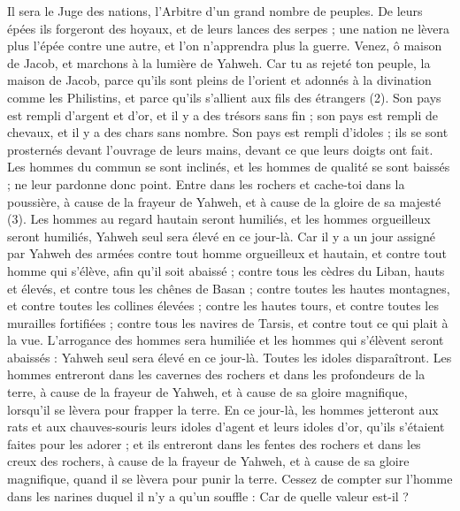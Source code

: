 \begin{multicols}{2}
Il sera le Juge des nations, l’Arbitre d’un grand nombre de peuples. De leurs épées ils forgeront des hoyaux, et de leurs lances des serpes ; une nation ne lèvera plus l'épée contre une autre, et l’on n’apprendra plus la guerre.
Venez, ô maison de Jacob, et marchons à la lumière de Yahweh.
Car tu as rejeté ton peuple, la maison de Jacob, parce qu'ils sont pleins de l’orient et adonnés à la divination comme les Philistins, et parce qu’ils s’allient aux fils des étrangers (2).
Son pays est rempli d'argent et d'or, et il y a des trésors sans fin ; son pays est rempli de chevaux, et il y a des chars sans nombre.
Son pays est rempli d'idoles ; ils se sont prosternés devant l'ouvrage de leurs mains, devant ce que leurs doigts ont fait.
Les hommes du commun se sont inclinés, et les hommes de qualité se sont baissés ; ne leur pardonne donc point.
Entre dans les rochers et cache-toi dans la poussière, à cause de la frayeur de Yahweh, et à cause de la gloire de sa majesté (3).
Les hommes au regard hautain seront humiliés, et les hommes orgueilleux seront humiliés, Yahweh seul sera élevé en ce jour-là.
Car il y a un jour assigné par Yahweh des armées contre tout homme orgueilleux et hautain, et contre tout homme qui s'élève, afin qu’il soit abaissé ;
contre tous les cèdres du Liban, hauts et élevés, et contre tous les chênes de Basan ;
contre toutes les hautes montagnes, et contre toutes les collines élevées ;
contre les hautes tours, et contre toutes les murailles fortifiées ;
contre tous les navires de Tarsis, et contre tout ce qui plait à la vue.
L’arrogance des hommes sera humiliée et les hommes qui s'élèvent seront abaissés :
Yahweh seul sera élevé en ce jour-là. Toutes les idoles disparaîtront.
Les hommes entreront dans les cavernes des rochers et dans les profondeurs de la terre, à cause de la frayeur de Yahweh, et à cause de sa gloire magnifique, lorsqu'il se lèvera pour frapper la terre.
En ce jour-là, les hommes jetteront aux rats et aux chauves-souris leurs idoles d’agent et leurs idoles d’or, qu’ils s’étaient faites pour les adorer ;
et ils entreront dans les fentes des rochers et dans les creux des rochers, à cause de la frayeur de Yahweh, et à cause de sa gloire magnifique, quand il se lèvera pour punir la terre.
Cessez de compter sur l'homme dans les narines duquel il n’y a qu’un souffle : Car de quelle valeur est-il ?

\end{multicols}
